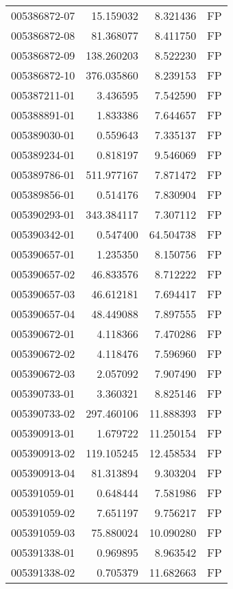 \begin{tabular}{lrrl}
005386872-07 &   15.159032 &     8.321436 &   FP \\
005386872-08 &   81.368077 &     8.411750 &   FP \\
005386872-09 &  138.260203 &     8.522230 &   FP \\
005386872-10 &  376.035860 &     8.239153 &   FP \\
005387211-01 &    3.436595 &     7.542590 &   FP \\
005388891-01 &    1.833386 &     7.644657 &   FP \\
005389030-01 &    0.559643 &     7.335137 &   FP \\
005389234-01 &    0.818197 &     9.546069 &   FP \\
005389786-01 &  511.977167 &     7.871472 &   FP \\
005389856-01 &    0.514176 &     7.830904 &   FP \\
005390293-01 &  343.384117 &     7.307112 &   FP \\
005390342-01 &    0.547400 &    64.504738 &   FP \\
005390657-01 &    1.235350 &     8.150756 &   FP \\
005390657-02 &   46.833576 &     8.712222 &   FP \\
005390657-03 &   46.612181 &     7.694417 &   FP \\
005390657-04 &   48.449088 &     7.897555 &   FP \\
005390672-01 &    4.118366 &     7.470286 &   FP \\
005390672-02 &    4.118476 &     7.596960 &   FP \\
005390672-03 &    2.057092 &     7.907490 &   FP \\
005390733-01 &    3.360321 &     8.825146 &   FP \\
005390733-02 &  297.460106 &    11.888393 &   FP \\
005390913-01 &    1.679722 &    11.250154 &   FP \\
005390913-02 &  119.105245 &    12.458534 &   FP \\
005390913-04 &   81.313894 &     9.303204 &   FP \\
005391059-01 &    0.648444 &     7.581986 &   FP \\
005391059-02 &    7.651197 &     9.756217 &   FP \\
005391059-03 &   75.880024 &    10.090280 &   FP \\
005391338-01 &    0.969895 &     8.963542 &   FP \\
005391338-02 &    0.705379 &    11.682663 &   FP \\

\end{tabular}
